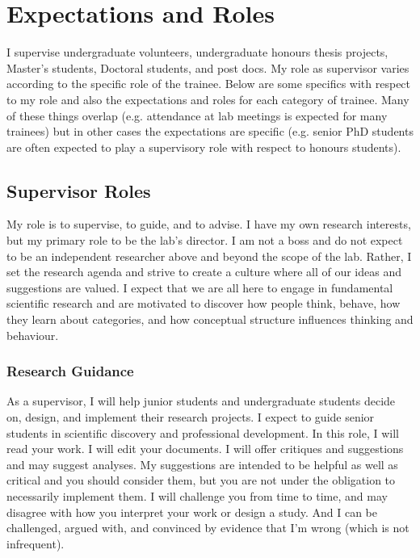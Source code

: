 \documentclass{article}
\begin{document}
\section{Expectations and Roles} 
I supervise undergraduate volunteers, undergraduate honours thesis projects, Master's students, Doctoral students, and post docs. My role as supervisor varies according to the specific role of the trainee. Below are some specifics with respect to my role and also the expectations and roles for each category of trainee. Many of these things overlap (e.g. attendance at lab meetings is expected for many trainees) but in other cases the expectations are specific (e.g. senior PhD students are often expected to play a supervisory role with respect to honours students). 

\subsection{Supervisor Roles}
My role is to supervise, to guide, and to advise. I have my own research interests, but my primary role to be the lab's director. I am not a boss and do not expect to be an independent researcher above and beyond the scope of the lab. Rather, I set the research agenda and strive to create a culture where all of our ideas and suggestions are valued. I expect that we are all here to engage in fundamental scientific research and are motivated to discover how people think, behave, how they learn about categories, and how conceptual structure influences thinking and behaviour. 


\subsubsection{Research Guidance} As a supervisor, I will help junior students and undergraduate students decide on, design, and implement their research projects. I expect to guide senior students in scientific discovery and professional development. In this role, I will read your work. I will edit your documents. I will offer critiques and suggestions and may suggest analyses. My suggestions are intended to be helpful as well as critical and you should consider them, but you are not under the obligation to necessarily implement them.  I will challenge you from time to time, and may disagree with how you interpret your work or design a study. And I can be challenged, argued with, and convinced by evidence that I'm wrong (which is not infrequent).
\end{document}
